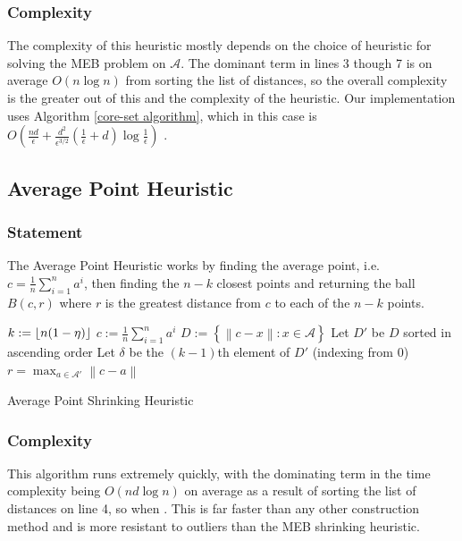 \documentclass[11pt,twoside]{report}
\newcommand{\A}{\mathcal{A}} %
\newcommand{\norm}[1]{\left\lVert#1\right\rVert} %
\DeclarePairedDelimiter\floor{\lfloor}{\rfloor}
\theoremstyle{definition}
\numberwithin{theorem}{section}
\numberwithin{definition}{section}
\numberwithin{lemma}{section}
\numberwithin{proposition}{section}
\numberwithin{equation}{section}
\numberwithin{figure}{section}
\begin{document}
\subsubsection{Complexity}
The complexity of this heuristic mostly depends on the choice of heuristic for solving the MEB problem on $\A$. The dominant term in lines 3 though 7 is on average $O(n\log n)$ from sorting the list of distances, so the overall complexity is the greater out of this and the complexity of the heuristic. Our implementation uses Algorithm \ref{core-set algorithm}, which in this case is $O\left(\frac{nd}{\epsilon}+\frac{d^2}{\epsilon^{3/2}}\left(\frac{1}{\epsilon}+d\right)\log\frac{1}{\epsilon}\right)$ \cite[Page 6]{core-sets}.
\subsection{Average Point Heuristic}
\subsubsection{Statement}
The Average Point Heuristic works by finding the average point, i.e. $c=\frac{1}{n}\sum_{i=1}^n a^i$, then finding the $n-k$ closest points and returning the ball $B(c,r)$ where $r$ is the greatest distance from $c$ to each of the $n-k$ points.

\begin{algorithm}[H]\label{avg point shrink}
    \SetAlgoLined
    \KwIn{Data set $\A$, $\eta\in[0,1]$}
    $k:=\floor{n(1-\eta)}$\;
    $c:=\frac{1}{n}\sum_{i=1}^na^i$\;
    $D:=\left\{\norm{c-x}: x\in\A\right\}$\;
    Let $D'$ be $D$ sorted in ascending order\;
    Let $\delta$ be the $(k-1)$th element of $D'$ (indexing from 0)\;
    $r = \max_{a\in\A'}\norm{c-a}$\;
    
    \caption{Average Point Shrinking Heuristic}
\end{algorithm}

\subsubsection{Complexity}
This algorithm runs extremely quickly, with the dominating term in the time complexity being $O(nd\log n)$ on average as a result of sorting the list of distances on line 4, so when . This is far faster than any other construction method and is more resistant to outliers than the MEB shrinking heuristic.
\end{document}
